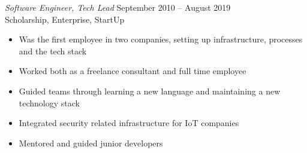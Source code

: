 \documentclass[10pt]{res} %
\begin{document}
\begin{resume}
{\sl Software Engineer, Tech Lead} \hfill September 2010 -- August 2019 \\
Scholarship, Enterprise, StartUp\\

\begin{itemize}
	\item Was the first employee in two companies, setting up infrastructure, processes and the tech stack
	\item Worked both as a freelance consultant and full time employee
	\item Guided teams through learning a new language and maintaining a new technology stack
	\item Integrated security related infrastructure for IoT companies
	\item Mentored and guided junior developers
\end{itemize}


\end{resume} 
\end{document}
